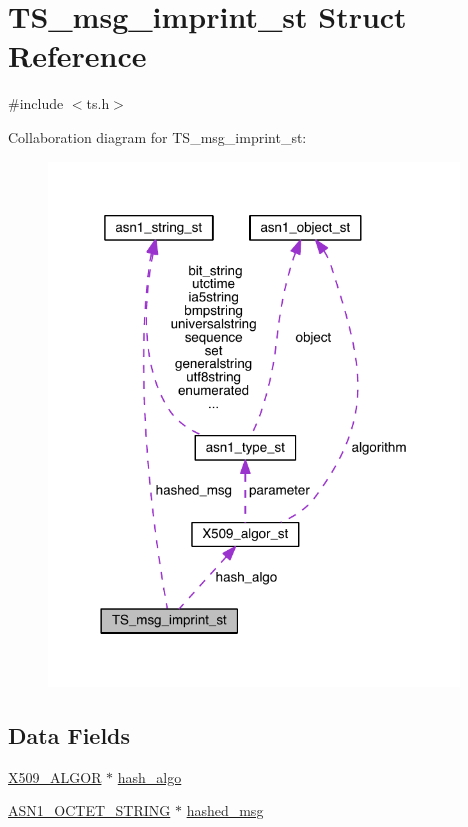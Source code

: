 \hypertarget{struct_t_s__msg__imprint__st}{}\section{T\+S\+\_\+msg\+\_\+imprint\+\_\+st Struct Reference}
\label{struct_t_s__msg__imprint__st}


{\ttfamily \#include $<$ts.\+h$>$}



Collaboration diagram for T\+S\+\_\+msg\+\_\+imprint\+\_\+st\+:\nopagebreak
\begin{figure}[H]
\begin{center}
\leavevmode
\includegraphics[width=309pt]{struct_t_s__msg__imprint__st__coll__graph}
\end{center}
\end{figure}
\subsection*{Data Fields}
\begin{DoxyCompactItemize}
\item 
\hyperlink{crypto_2ossl__typ_8h_aa2b6185e6254f36f709cd6577fb5022e}{X509\+\_\+\+A\+L\+G\+OR} $\ast$ \hyperlink{struct_t_s__msg__imprint__st_a2f5ec8cba655c24383a69218680e57c0}{hash\+\_\+algo}
\item 
\hyperlink{crypto_2ossl__typ_8h_afbd05e94e0f0430a2b729473efec88c1}{A\+S\+N1\+\_\+\+O\+C\+T\+E\+T\+\_\+\+S\+T\+R\+I\+NG} $\ast$ \hyperlink{struct_t_s__msg__imprint__st_adb78af7d6c57b86482e3686d52c225fc}{hashed\+\_\+msg}
\end{DoxyCompactItemize}


